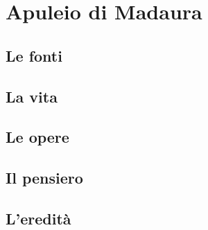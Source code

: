 \chapter{Apuleio di Madaura}

\section{Le fonti}

\section{La vita}

\section{Le opere}

\section{Il pensiero}

\section{L'eredità}
